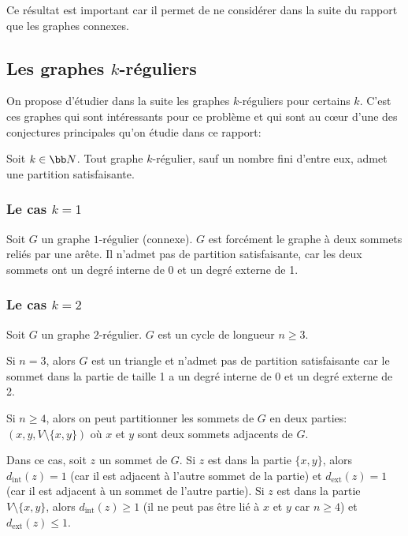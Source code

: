 Ce résultat est important car il permet de ne considérer dans la suite du rapport que les graphes connexes.

\subsection{Les graphes \(k\)-réguliers}\label{subsec:ss4_2}

On propose d'étudier dans la suite les graphes \(k\)-réguliers pour certains \(k\).
C'est ces graphes qui sont intéressants pour ce problème et qui sont au cœur d'une des conjectures principales qu'on étudie dans ce rapport:

\begin{conjecture}
    Soit \(k \in \bb N\).
    Tout graphe \(k\)-régulier, sauf un nombre fini d'entre eux, admet une partition satisfaisante.
\end{conjecture}

\subsubsection{Le cas \(k = 1\)}\label{subsubsec:ss4_2_1}

Soit \(G\) un graphe \(1\)-régulier (connexe).
\(G\) est forcément le graphe à deux sommets reliés par une arête.
Il n'admet pas de partition satisfaisante, car les deux sommets ont un degré interne de 0 et un degré externe de 1.

\subsubsection{Le cas \(k = 2\)}\label{subsubsec:ss4_2_2}

Soit \(G\) un graphe \(2\)-régulier.
\(G\) est un cycle de longueur \(n \geq 3\).

Si \(n = 3\), alors \(G\) est un triangle et n'admet pas de partition satisfaisante car le sommet dans la partie de taille 1 a un degré interne de 0 et un degré externe de 2.

Si \(n \geq 4\), alors on peut partitionner les sommets de \(G\) en deux parties: \(({x, y}, V \setminus \{x, y\})\) où \(x\) et \(y\) sont deux sommets adjacents de \(G\).

Dans ce cas, soit \(z\) un sommet de \(G\).
Si \(z\) est dans la partie \(\{x, y\}\), alors \(d_{\mathrm{int}}(z) = 1\) (car il est adjacent à l'autre sommet de la partie) et \(d_{\mathrm{ext}}(z) = 1\) (car il est adjacent à un sommet de l'autre partie).
Si \(z\) est dans la partie \(V \setminus \{x, y\}\), alors \(d_{\mathrm{int}}(z) \geq 1\) (il ne peut pas être lié à \(x\) et \(y\) car \(n \geq 4\)) et \(d_{\mathrm{ext}}(z) \leq 1\).

